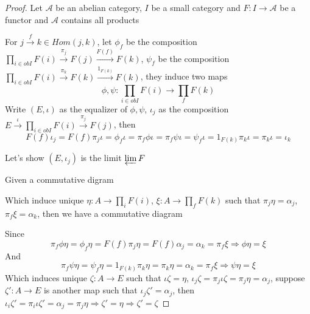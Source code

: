 \documentclass{article}
\theoremstyle{definition}
\theoremstyle{remark}
\theoremstyle{definition}
\begin{document}
\begin{proof}
Let $\mathcal A$ be an abelian category, $I$ be a small category and $F:I\to\mathcal A$ be a functor and $\mathcal A$ contains all products \par
For $j\xrightarrow{f}k\in Hom(j,k)$, let $\phi_f$ be the composition $\displaystyle\prod_{i\in obI}F(i)\xrightarrow{\pi_j} F(j)\xrightarrow{F(f)} F(k)$, $\psi_f$ be the composition $\displaystyle\prod_{i\in obI}F(i)\xrightarrow{\pi_k} F(k)\xrightarrow{1_{F(k)}} F(k)$, they induce two maps
\[\displaystyle \phi,\psi:\prod_{i\in obI}F(i)\to\prod_{f}F(k)\]
Write $(E,\iota)$ as the equalizer of $\phi,\psi$, $\iota_j$ as the composition $\displaystyle E\xrightarrow{\iota}\prod_{i\in obI}F(i)\xrightarrow{\pi_j} F(j)$, then
\[F(f)\iota_j=F(f)\pi_j\iota=\phi_f\iota=\pi_f\phi\iota=\pi_f\psi\iota=\psi_f\iota=1_{F(k)}\pi_k\iota=\pi_k\iota=\iota_k\]
\begin{center}
\end{center}
Let's show $(E,\iota_j)$ is the limit $\varprojlim F$ \par
Given a commutative digram
\begin{center}
\end{center}
Which induce unique $\eta:A\to\prod_iF(i)$, $\xi:A\to\prod_fF(k)$ such that $\pi_j\eta=\alpha_j$, $\pi_f\xi=\alpha_k$, then we have a commutative diagram
\begin{center}
\end{center}
Since
\[\pi_f\phi\eta=\phi_f\eta=F(f)\pi_j\eta=F(f)\alpha_j=\alpha_k=\pi_f\xi\Rightarrow\phi\eta=\xi\]
And
\[\pi_f\psi\eta=\psi_f\eta=1_{F(k)}\pi_k\eta=\pi_k\eta=\alpha_k=\pi_f\xi\Rightarrow\psi\eta=\xi\]
Which induces unique $\zeta:A\to E$ such that $\iota\zeta=\eta$, $\iota_j\zeta=\pi_j\iota\zeta=\pi_j\eta=\alpha_j$, suppose $\zeta':A\to E$ is another map such that $\iota_j\zeta'=\alpha_j$, then $\iota_i\zeta'=\pi_i\iota\zeta'=\alpha_j=\pi_j\eta\Rightarrow\zeta'=\eta\Rightarrow\zeta'=\zeta$
\end{proof}
\end{document}
